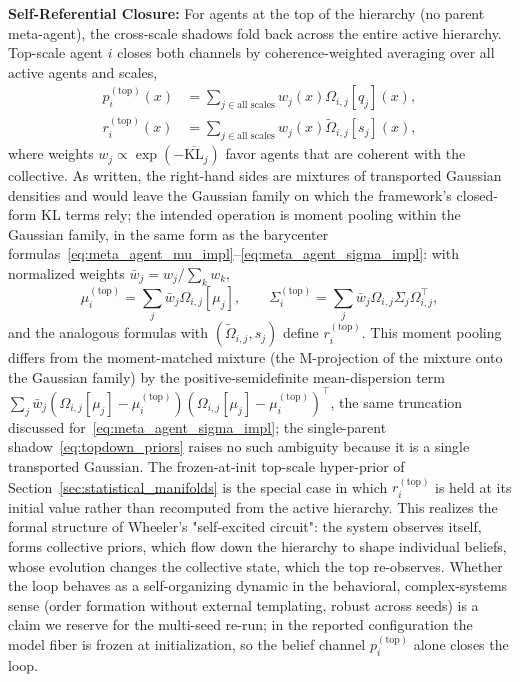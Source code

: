 \documentclass[11pt]{article}
\begin{document}
\textbf{Self-Referential Closure:} For agents at the top of the hierarchy (no parent meta-agent), the cross-scale shadows fold back across the entire active hierarchy. Top-scale agent $i$ closes both channels by coherence-weighted averaging over all active agents and scales,
\begin{align}
p_i^{(\text{top})}(x) &= \sum_{j \in \text{all scales}} w_j(x)  \Omega_{i,j}[q_j](x), \\
r_i^{(\text{top})}(x) &= \sum_{j \in \text{all scales}} w_j(x)  \tilde\Omega_{i,j}[s_j](x),
\end{align}
where weights $w_j \propto \exp(-\overline{\mathrm{KL}}_j)$ favor agents that are coherent with the collective. As written, the right-hand sides are mixtures of transported Gaussian densities and would leave the Gaussian family on which the framework's closed-form KL terms rely; the intended operation is moment pooling within the Gaussian family, in the same form as the barycenter formulas~\eqref{eq:meta_agent_mu_impl}--\eqref{eq:meta_agent_sigma_impl}: with normalized weights $\bar{w}_j = w_j / \sum_k w_k$,
\begin{equation}
\mu_i^{(\text{top})} = \sum_j \bar{w}_j  \Omega_{i,j}[\mu_j],
\qquad
\Sigma_i^{(\text{top})} = \sum_j \bar{w}_j  \Omega_{i,j} \Sigma_j \Omega_{i,j}^\top,
\end{equation}
and the analogous formulas with $(\tilde\Omega_{i,j}, s_j)$ define $r_i^{(\text{top})}$. This moment pooling differs from the moment-matched mixture (the M-projection of the mixture onto the Gaussian family) by the positive-semidefinite mean-dispersion term $\sum_j \bar{w}_j (\Omega_{i,j}[\mu_j] - \mu_i^{(\text{top})})(\Omega_{i,j}[\mu_j] - \mu_i^{(\text{top})})^\top$, the same truncation discussed for~\eqref{eq:meta_agent_sigma_impl}; the single-parent shadow~\eqref{eq:topdown_priors} raises no such ambiguity because it is a single transported Gaussian. The frozen-at-init top-scale hyper-prior of Section~\ref{sec:statistical_manifolds} is the special case in which $r_i^{(\text{top})}$ is held at its initial value rather than recomputed from the active hierarchy. This realizes the formal structure of Wheeler's "self-excited circuit": the system observes itself, forms collective priors, which flow down the hierarchy to shape individual beliefs, whose evolution changes the collective state, which the top re-observes. Whether the loop behaves as a self-organizing dynamic in the behavioral, complex-systems sense (order formation without external templating, robust across seeds) is a claim we reserve for the multi-seed re-run; in the reported configuration the model fiber is frozen at initialization, so the belief channel $p_i^{(\text{top})}$ alone closes the loop.
\end{document}
